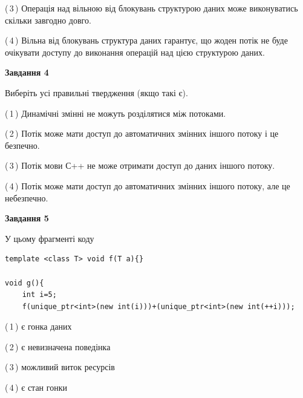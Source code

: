 \documentclass[12pt, ukrainian]{article}
\begin{document}
\begin {large}
{(\,3\,) Операція над вільною від блокувань структурою даних може виконуватись скільки завгодно довго.%

(\,4\,) Вільна від блокувань структура даних гарантує, що жоден потік не буде очікувати доступу до виконання операцій над цією структурою даних.%



\begin{center}
\textbf{Завдання 4}
\end{center}
Виберіть усі правильні твердження (якщо такі є).\par
\vspace{2mm}

(\,1\,) Динамічні змінні не можуть розділятися між потоками.%

(\,2\,) Потік може мати доступ до автоматичних змінних іншого потоку і це безпечно.%

(\,3\,) Потік мови С++ не може отримати доступ до даних іншого потоку.%

(\,4\,) Потік може мати доступ до автоматичних змінних іншого потоку, але це небезпечно.%



\begin{center}
\textbf{Завдання 5}
\end{center}
У цьому фрагменті коду
\begin{verbatim}
template <class T> void f(T a){}

void g(){
    int i=5;
    f(unique_ptr<int>(new int(i)))+(unique_ptr<int>(new int(++i)));
\end{verbatim}
(\,1\,) є гонка даних%

(\,2\,) є невизначена поведінка%

(\,3\,) можливий виток ресурсів%

(\,4\,) є стан гонки%


}
\end {large}
\end{document}

